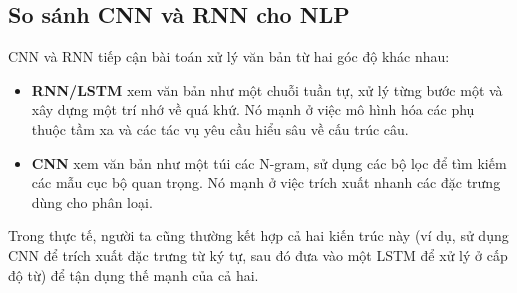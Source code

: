 \subsection{So sánh CNN và RNN cho NLP}
CNN và RNN tiếp cận bài toán xử lý văn bản từ hai góc độ khác nhau:
\begin{itemize}
    \item \textbf{RNN/LSTM} xem văn bản như một chuỗi tuần tự, xử lý từng bước một và xây dựng một trí nhớ về quá khứ. Nó mạnh ở việc mô hình hóa các phụ thuộc tầm xa và các tác vụ yêu cầu hiểu sâu về cấu trúc câu.
    \item \textbf{CNN} xem văn bản như một túi các N-gram, sử dụng các bộ lọc để tìm kiếm các mẫu cục bộ quan trọng. Nó mạnh ở việc trích xuất nhanh các đặc trưng dùng cho phân loại.
\end{itemize}
Trong thực tế, người ta cũng thường kết hợp cả hai kiến trúc này (ví dụ, sử dụng CNN để trích xuất đặc trưng từ ký tự, sau đó đưa vào một LSTM để xử lý ở cấp độ từ) để tận dụng thế mạnh của cả hai.
